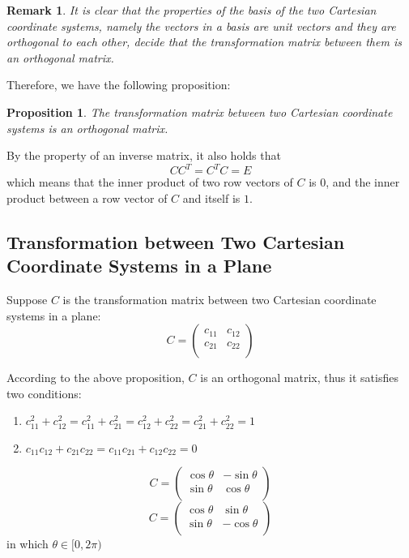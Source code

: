 \documentclass[onecolumn]{ctexart}
\newtheorem{proposition}{Proposition}
\newtheorem{remark}{Remark}
\begin{document}
\begin{remark}
  It is clear that the properties of the basis of the two Cartesian coordinate 
  systems, namely the vectors in a basis are unit vectors and they are 
  orthogonal to each other, decide that the transformation matrix between them 
  is an orthogonal matrix.
\end{remark}

Therefore, we have the following proposition:
\begin{proposition}
  The transformation matrix between two Cartesian coordinate systems is an 
  orthogonal matrix.
\end{proposition}

By the property of an inverse matrix, it also holds that
\[
  C C^T = C^T C = E
\]
which means that the inner product of two row vectors of $C$ is $0$, and the 
inner product between a row vector of $C$ and itself is $1$.

\subsection{Transformation between Two Cartesian Coordinate Systems in a Plane}

Suppose $C$ is the transformation matrix between two Cartesian coordinate systems in a plane:
\[
  C = 
  \begin{pmatrix}
    c_{11} & c_{12} \\
    c_{21} & c_{22} \\
  \end{pmatrix}
\]

According to the above proposition, $C$ is an orthogonal matrix, thus it 
satisfies two conditions:
\begin{enumerate}
  \item $c_{11}^2 + c_{12}^2 = c_{11}^2 + c_{21}^2 = c_{12}^2 + c_{22}^2 = c_{21}^2 + c_{22}^2 = 1$
  \item $c_{11} c_{12} + c_{21} c_{22} = c_{11} c_{21} + c_{12} c_{22} = 0$
\end{enumerate}

\[
  C = 
  \begin{pmatrix}
    \cos\theta & -\sin\theta \\
    \sin\theta & \cos\theta \\
  \end{pmatrix}
\]
\[
  C = 
  \begin{pmatrix}
    \cos\theta & \sin\theta \\
    \sin\theta & -\cos\theta \\
  \end{pmatrix} 
\]
in which $\theta \in \lbrack 0, 2\pi)$
\end{document}
